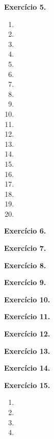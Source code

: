 \documentclass[12pt,a4paper]{article}
\begin{document}
\vspace{0.5cm}
\noindent\textbf{Exercício 5.}
\begin{enumerate}
    \renewcommand{\theenumi}{\alph{enumi}}
    \renewcommand{\labelenumi}{\theenumi)}
    \item 
    \item 
    \item 
    \item 
    \item 
    \item 
    \item 
    \item 
    \item 
    \item 
    \item 
    \item 
    \item 
    \item 
    \item 
    \item 
    \item 
    \item 
    \item 
    \item 
\end{enumerate}

\vspace{0.5cm}
\noindent\textbf{Exercício 6.}

\vspace{0.5cm}
\noindent\textbf{Exercício 7.}

\vspace{0.5cm}
\noindent\textbf{Exercício 8.}

\vspace{0.5cm}
\noindent\textbf{Exercício 9.}

\vspace{0.5cm}
\noindent\textbf{Exercício 10.}

\vspace{0.5cm}
\noindent\textbf{Exercício 11.}

\vspace{0.5cm}
\noindent\textbf{Exercício 12.}

\vspace{0.5cm}
\noindent\textbf{Exercício 13.}

\vspace{0.5cm}
\noindent\textbf{Exercício 14.}

\vspace{0.5cm}
\noindent\textbf{Exercício 15.}
\begin{enumerate}
    \renewcommand{\theenumi}{\alph{enumi}}
    \renewcommand{\labelenumi}{\theenumi)}
    \item 
    \item 
    \item 
    \item 
\end{enumerate}
\end{document}
